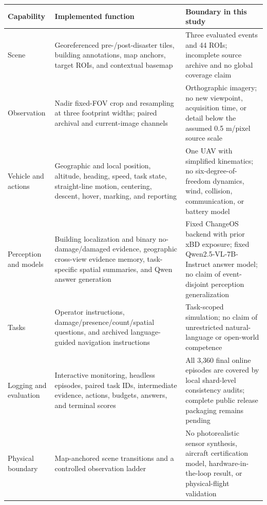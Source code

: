 \begin{tabularx}{\linewidth}{@{}>{\raggedright\arraybackslash}p{2.25cm}>{\raggedright\arraybackslash}X>{\raggedright\arraybackslash}X@{}}
\toprule
Capability & Implemented function & Boundary in this study \\
\midrule
Scene & Georeferenced pre-/post-disaster tiles, building annotations, map anchors, target ROIs, and contextual basemap & Three evaluated events and 44 ROIs; incomplete source archive and no global coverage claim \\
Observation & Nadir fixed-FOV crop and resampling at three footprint widths; paired archival and current-image channels & Orthographic imagery; no new viewpoint, acquisition time, or detail below the assumed 0.5 m/pixel source scale \\
Vehicle and actions & Geographic and local position, altitude, heading, speed, task state, straight-line motion, centering, descent, hover, marking, and reporting & One UAV with simplified kinematics; no six-degree-of-freedom dynamics, wind, collision, communication, or battery model \\
Perception and models & Building localization and binary no-damage/damaged evidence, geographic cross-view evidence memory, task-specific spatial summaries, and Qwen answer generation & Fixed ChangeOS backend with prior xBD exposure; fixed Qwen2.5-VL-7B-Instruct answer model; no claim of event-disjoint perception generalization \\
Tasks & Operator instructions, damage/presence/count/spatial questions, and archived language-guided navigation instructions & Task-scoped simulation; no claim of unrestricted natural-language or open-world competence \\
Logging and evaluation & Interactive monitoring, headless episodes, paired task IDs, intermediate evidence, actions, budgets, answers, and terminal scores & All 3,360 final online episodes are covered by local shard-level consistency audits; complete public release packaging remains pending \\
Physical boundary & Map-anchored scene transitions and a controlled observation ladder & No photorealistic sensor synthesis, aircraft certification model, hardware-in-the-loop result, or physical-flight validation \\
\bottomrule
\end{tabularx}

